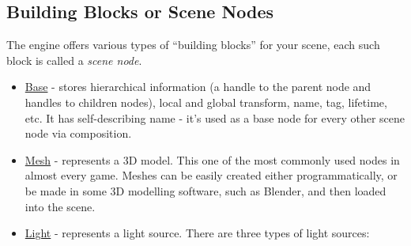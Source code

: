 \documentclass[
]{book}
\providecommand{\tightlist}{%
  \setlength{\itemsep}{0pt}\setlength{\parskip}{0pt}}
\theoremstyle{definition}
\theoremstyle{definition}
\theoremstyle{definition}
\theoremstyle{definition}
\theoremstyle{remark}
\begin{document}
\subsection{Building Blocks or Scene Nodes}\label{building-blocks-or-scene-nodes}

The engine offers various types of ``building blocks'' for your scene, each such block is called a \emph{scene node}.

\begin{itemize}
\tightlist
\item
  \href{../scene/base_node.md}{Base} - stores hierarchical information (a handle to the parent node and handles to children nodes), local and global transform, name, tag, lifetime, etc. It has self-describing name - it's used as a base node for every other scene node via composition.
\item
  \href{../scene/mesh_node.md}{Mesh} - represents a 3D model. This one of the most commonly used nodes in almost every game. Meshes can be easily created either programmatically, or be made in some 3D modelling software, such as Blender, and then loaded into the scene.
\item
  \href{../scene/light_node.md}{Light} - represents a light source. There are three types of light sources:


\end{itemize}
\end{document}
